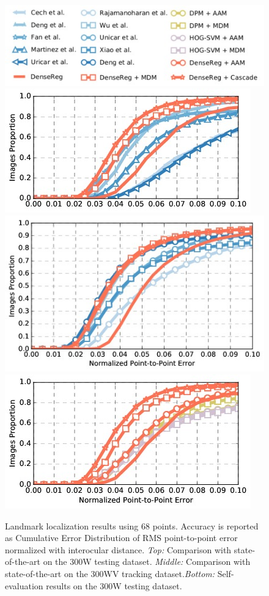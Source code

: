 \begin{figure}[!b]
\vspace{-0.25cm}
\centering
\includegraphics[width=0.9\linewidth]{Figures/legend_all}
\includegraphics[width=0.9\linewidth]{Figures/300w_68}
\includegraphics[width=0.9\linewidth]{Figures/300vw_all}
\includegraphics[width=0.9\linewidth]{Figures/300w_selfevaluation}
\caption{Landmark localization results using 68 points. Accuracy is reported as Cumulative Error Distribution of RMS point-to-point error normalized with interocular distance. \emph{Top:} Comparison with state-of-the-art on the 300W testing dataset. \emph{Middle:} Comparison with state-of-the-art on the 300WV tracking dataset.\emph{Bottom:} Self-evaluation results on the 300W testing dataset.}
\vspace{-0.15cm}
\label{fig:300w}
\end{figure}

